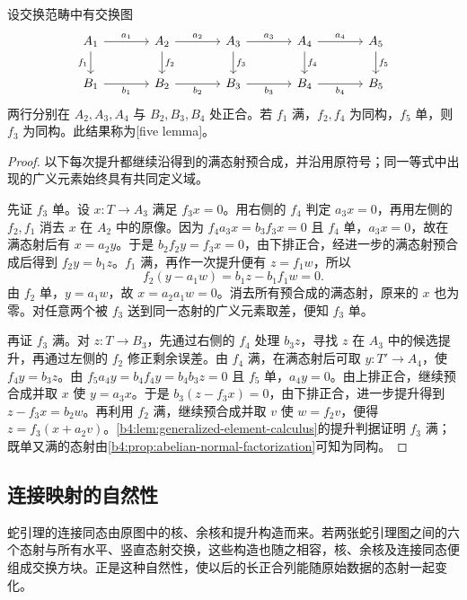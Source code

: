\begin{theorem}[五引理]\label{b4:thm:five-lemma}
	设交换范畴中有交换图
	\[
		\begin{tikzcd}[column sep=large]
			A_1\arrow[r,"a_1"]\arrow[d,"f_1"']&A_2\arrow[r,"a_2"]\arrow[d,"f_2"]&A_3\arrow[r,"a_3"]\arrow[d,"f_3"]&A_4\arrow[r,"a_4"]\arrow[d,"f_4"]&A_5\arrow[d,"f_5"]\\
			B_1\arrow[r,"b_1"']&B_2\arrow[r,"b_2"']&B_3\arrow[r,"b_3"']&B_4\arrow[r,"b_4"']&B_5
		\end{tikzcd}
	\]
	两行分别在 \(A_2,A_3,A_4\) 与 \(B_2,B_3,B_4\) 处正合。若 \(f_1\) 满，\(f_2,f_4\) 为同构，\(f_5\) 单，则 \(f_3\) 为同构。此结果称为[five lemma]。
\end{theorem}
\begin{proof}
	以下每次提升都继续沿得到的满态射预合成，并沿用原符号；同一等式中出现的广义元素始终具有共同定义域。

	先证 \(f_3\) 单。设 \(x:T\to A_3\) 满足 \(f_3x=0\)。用右侧的 \(f_4\) 判定 \(a_3x=0\)，再用左侧的 \(f_2,f_1\) 消去 \(x\) 在 \(A_2\) 中的原像。因为 \(f_4a_3x=b_3f_3x=0\) 且 \(f_4\) 单，\(a_3x=0\)，故在满态射后有 \(x=a_2y\)。于是 \(b_2f_2y=f_3x=0\)，由下排正合，经进一步的满态射预合成后得到 \(f_2y=b_1z\)。\(f_1\) 满，再作一次提升便有 \(z=f_1w\)，所以
	\[
		f_2(y-a_1w)=b_1z-b_1f_1w=0.
	\]
	由 \(f_2\) 单，\(y=a_1w\)，故 \(x=a_2a_1w=0\)。消去所有预合成的满态射，原来的 \(x\) 也为零。对任意两个被 \(f_3\) 送到同一态射的广义元素取差，便知 \(f_3\) 单。

	再证 \(f_3\) 满。对 \(z:T\to B_3\)，先通过右侧的 \(f_4\) 处理 \(b_3z\)，寻找 \(z\) 在 \(A_3\) 中的候选提升，再通过左侧的 \(f_2\) 修正剩余误差。由 \(f_4\) 满，在满态射后可取 \(y:T'\to A_4\)，使 \(f_4y=b_3z\)。由 \(f_5a_4y=b_4f_4y=b_4b_3z=0\) 且 \(f_5\) 单，\(a_4y=0\)。由上排正合，继续预合成并取 \(x\) 使 \(y=a_3x\)。于是 \(b_3(z-f_3x)=0\)，由下排正合，进一步提升得到 \(z-f_3x=b_2w\)。再利用 \(f_2\) 满，继续预合成并取 \(v\) 使 \(w=f_2v\)，便得 \(z=f_3(x+a_2v)\)。\cref{b4:lem:generalized-element-calculus}的提升判据证明 \(f_3\) 满；既单又满的态射由\cref{b4:prop:abelian-normal-factorization}可知为同构。
\end{proof}

\subsection{连接映射的自然性}
\label{b4:subsec:0404:02}

蛇引理的连接同态由原图中的核、余核和提升构造而来。若两张蛇引理图之间的六个态射与所有水平、竖直态射交换，这些构造也随之相容，核、余核及连接同态便组成交换方块。正是这种自然性，使以后的长正合列能随原始数据的态射一起变化。

